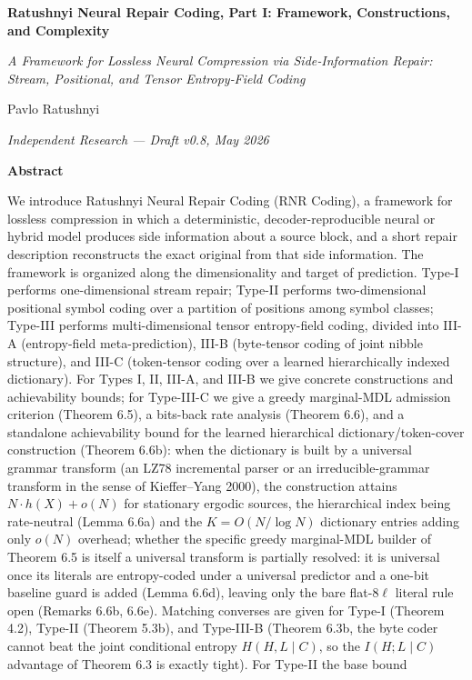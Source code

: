 \documentclass[
]{article}
\author{}
\date{}
\begin{document}
\textbf{Ratushnyi Neural Repair Coding, Part I: Framework, Constructions,
and Complexity}

\emph{A Framework for Lossless Neural Compression via Side‑Information
Repair: Stream, Positional, and Tensor Entropy‑Field Coding}

Pavlo Ratushnyi

\emph{Independent Research --- Draft v0.8, May 2026}

\textbf{Abstract}

We introduce Ratushnyi Neural Repair Coding (RNR Coding), a framework
for lossless compression in which a deterministic,
decoder-reproducible neural or hybrid model produces side information
about a source block, and a short repair description reconstructs the
exact original from that side information. The framework is organized
along the dimensionality and target of prediction. Type-I performs
one-dimensional stream repair; Type-II performs two-dimensional
positional symbol coding over a partition of positions among symbol
classes; Type-III performs multi-dimensional tensor entropy-field
coding, divided into III-A (entropy-field meta-prediction), III-B
(byte-tensor coding of joint nibble structure), and III-C
(token-tensor coding over a learned hierarchically indexed
dictionary). For Types I, II, III-A, and III-B we give concrete
constructions and achievability bounds; for Type-III-C we give a
greedy marginal-MDL admission criterion (Theorem 6.5), a
bits-back rate analysis (Theorem 6.6), and a standalone
achievability bound for the learned hierarchical
dictionary/token-cover construction (Theorem 6.6b): when the
dictionary is built by a universal grammar transform (an LZ78
incremental parser or an irreducible-grammar transform in the sense of
Kieffer--Yang 2000), the construction attains $N \cdot h(X) + o(N)$ for
stationary ergodic sources, the hierarchical index being rate-neutral
(Lemma 6.6a) and the $K = O(N/\log N)$ dictionary entries adding only
$o(N)$ overhead; whether the specific greedy marginal-MDL builder of
Theorem 6.5 is itself a universal transform is partially resolved: it is
universal once its literals are entropy-coded under a universal predictor
and a one-bit baseline guard is added (Lemma 6.6d), leaving only the bare
flat-$8\ell$ literal rule open (Remarks 6.6b, 6.6e).
Matching converses are given for Type-I (Theorem 4.2), Type-II
(Theorem 5.3b), and Type-III-B (Theorem 6.3b, the byte coder cannot beat
the joint conditional entropy $H(H,L\mid C)$, so the $I(H;L\mid C)$
advantage of Theorem 6.3 is exactly tight). For Type-II the base bound
\end{document}

